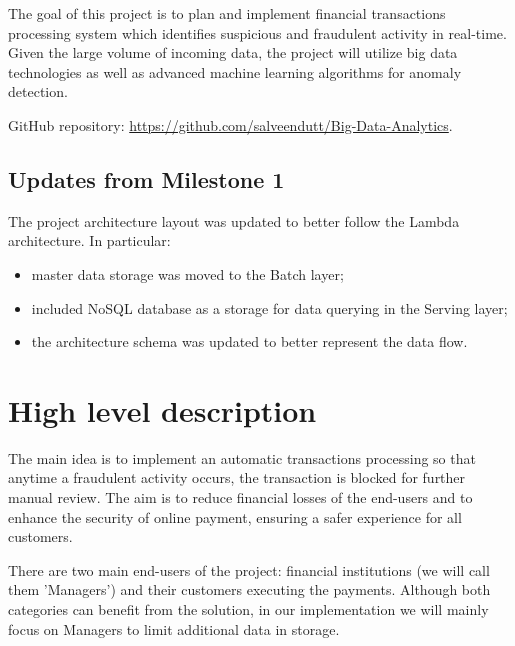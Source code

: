 \documentclass[12pt,a4paper, hidelinks]{article}
\begin{document}
The goal of this project is to plan and implement financial transactions processing system which identifies suspicious and fraudulent activity in real-time. Given the large volume of incoming data, the project will utilize big data technologies as well as advanced machine learning algorithms for anomaly detection.

GitHub repository: \href{https://github.com/salveendutt/Big-Data-Analytics}{https://github.com/salveendutt/Big-Data-Analytics}.

\subsection*{Updates from Milestone 1}
The project architecture layout was updated to better follow the Lambda architecture. In particular: 
\begin{itemize}
    \item master data storage was moved to the Batch layer;
    \item included NoSQL database as a storage for data querying in the Serving layer;
    \item the architecture schema was updated to better represent the data flow. 
\end{itemize}

\newpage

\section{High level description}

The main idea is to implement an automatic transactions processing so that anytime a fraudulent activity occurs, the transaction is blocked for further manual review. The aim is to reduce financial losses of the end-users and to enhance the security of online payment, ensuring a safer experience for all customers.

There are two main end-users of the project: financial institutions (we will call them 'Managers') and their customers executing the payments. Although both categories can benefit from the solution, in our implementation we will mainly focus on Managers to limit additional data in storage.
\end{document}
